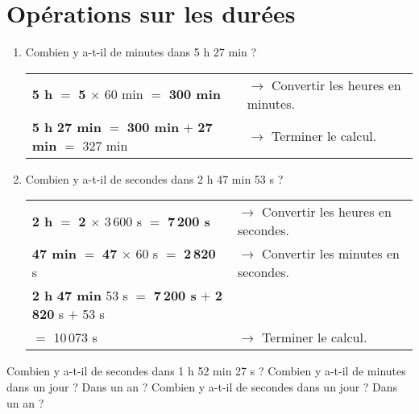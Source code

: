 
\section{Opérations sur les durées}



\begin{methode*1}

\begin{exemple*1}

\begin{enumerate}
\item Combien y a-t-il de minutes dans 5 h 27 min ?

\begin{tabular}{ll} 
\textcolor{bleu}{\textbf{5 h}} $=$ \textcolor{bleu}{\textbf{5}} $\times$ 60 min $=$ \textcolor{bleu}{\textbf{300 min}}  & $\rightarrow$ Convertir les heures en minutes. \\
\textcolor{bleu}{\textbf{5 h}} \textcolor{vert}{\textbf{27 min}} $=$ \textcolor{bleu}{\textbf{300 min}} $+$ \textcolor{vert}{\textbf{27 min}} $=$ 327 min & $\rightarrow$ Terminer le calcul.\\
\end{tabular} 

\vspace{2em}\item Combien y a-t-il de secondes dans 2 h 47 min 53 s ?

\begin{tabular}{ll} 
\textcolor{bleu}{\textbf{2 h}} $=$ \textcolor{bleu}{\textbf{2}} $\times$ 3\,600 s $=$ \textcolor{bleu}{\textbf{7\,200 s}} & $\rightarrow$ Convertir les heures en secondes. \\
\textcolor{vert}{\textbf{47 min}} $=$ \textcolor{vert}{\textbf{47}} $\times$ 60 s $=$ \textcolor{vert}{\textbf{2\,820}} s & $\rightarrow$ Convertir les minutes en secondes. \\
\textcolor{bleu}{\textbf{2 h}} \textcolor{vert}{\textbf{47 min}} 53 s $=$ \textcolor{bleu}{\textbf{7\,200 s}} $+$ \textcolor{vert}{\textbf{2\,820}} s $+$ 53 s  \\
\phantom{2 h 47 min 53 si}$=$ 10\,073 s & $\rightarrow$ Terminer le calcul. \\
\end{tabular}

\end{enumerate}
 
\end{exemple*1}

\exercice

Combien y a-t-il de secondes dans 1 h 52 min 27 s ? Combien y a-t-il de minutes dans un jour ? Dans un an ? Combien y a-t-il de secondes dans un jour ? Dans un an ?

\end{methode*1}



